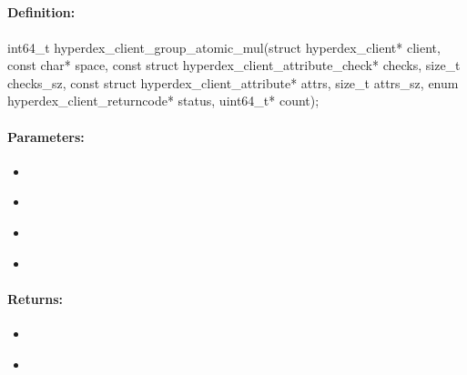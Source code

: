 \pagebreak
\subsection{}
\label{api:c:group_atomic_mul}


\paragraph{Definition:}
\begin{ccode}
int64_t hyperdex_client_group_atomic_mul(struct hyperdex_client* client,
        const char* space,
        const struct hyperdex_client_attribute_check* checks, size_t checks_sz,
        const struct hyperdex_client_attribute* attrs, size_t attrs_sz,
        enum hyperdex_client_returncode* status,
        uint64_t* count);
\end{ccode}

\paragraph{Parameters:}
\begin{itemize}[noitemsep]
\item {}\\

\item {}\\

\item {}\\

\item {}\\

\end{itemize}

\paragraph{Returns:}
\begin{itemize}[noitemsep]
\item {}\\

\item {}\\

\end{itemize}

